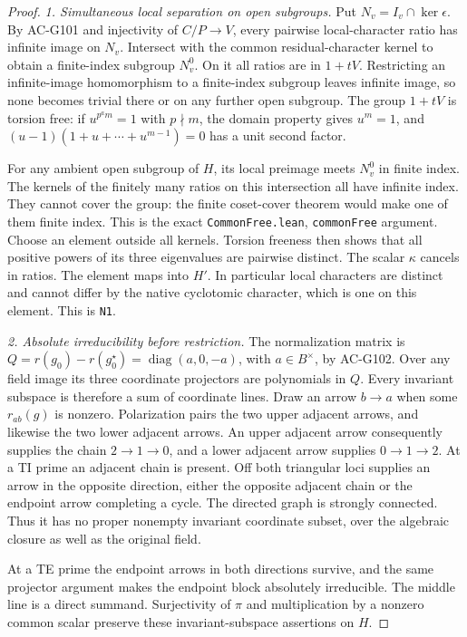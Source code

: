 \begin{proof}
\emph{1. Simultaneous local separation on open subgroups.}
Put \(N_v=I_v\cap\ker\epsilon\).
By AC-G101 and injectivity of \(C/P\to V\), every pairwise
local-character ratio has infinite image on \(N_v\).
Intersect with the common residual-character kernel to obtain
a finite-index subgroup \(N_v^0\).  On it all ratios are in
\(1+tV\).  Restricting an infinite-image homomorphism to a
finite-index subgroup leaves infinite image, so none becomes
trivial there or on any further open subgroup.
The group \(1+tV\) is torsion free: if \(u^{p^am}=1\)
with \(p\nmid m\), the domain property gives \(u^m=1\), and
\((u-1)(1+u+\cdots+u^{m-1})=0\) has a unit second factor.

For any ambient open subgroup of \(H\), its local preimage
meets \(N_v^0\) in finite index.  The kernels of the finitely
many ratios on this intersection all have infinite index.
They cannot cover the group: the finite coset-cover theorem
would make one of them finite index.  This is the exact
\texttt{CommonFree.lean}, \texttt{commonFree} argument.
Choose an element outside all kernels.  Torsion freeness then
shows that all positive powers of its three eigenvalues are
pairwise distinct.  The scalar \(\kappa\) cancels in ratios.
The element maps into \(H'\).  In particular local characters
are distinct and cannot differ by the native cyclotomic
character, which is one on this element.  This is \texttt{N1}.

\emph{2. Absolute irreducibility before restriction.}
The normalization matrix is
\(Q=r(g_0)-r(g_0^\star)=\operatorname{diag}(a,0,-a)\),
with \(a\in B^\times\), by AC-G102.
Over any field image its three coordinate projectors are
polynomials in \(Q\).  Every invariant subspace is therefore
a sum of coordinate lines.  Draw an arrow \(b\to a\) when
some \(r_{ab}(g)\) is nonzero.  Polarization pairs the two
upper adjacent arrows, and likewise the two lower adjacent
arrows.  An upper adjacent arrow consequently supplies the
chain \(2\to1\to0\), and a lower adjacent arrow supplies
\(0\to1\to2\).  At a TI prime an adjacent chain is present.
Off both triangular loci supplies an arrow in the opposite
direction, either the opposite adjacent chain or the endpoint
arrow completing a cycle.  The directed graph is strongly
connected.  Thus it has no proper nonempty invariant coordinate
subset, over the algebraic closure as well as the original field.

At a TE prime the endpoint arrows in both directions survive,
and the same projector argument makes the endpoint block
absolutely irreducible.  The middle line is a direct summand.
Surjectivity of \(\pi\) and multiplication by a nonzero common
scalar preserve these invariant-subspace assertions on \(H\).


\end{proof}
